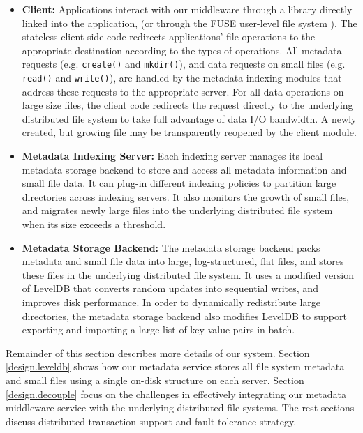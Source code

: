 \begin{itemize}
\item{\textbf{Client:}} Applications interact with our middleware
through a library directly linked into the application,
(or through the FUSE user-level file system \cite{fuse}).
The stateless client-side code redirects applications' file operations
to the appropriate destination according to the types of operations.
All metadata requests (e.g. \texttt{create()} and \texttt{mkdir()}),
and data requests on small files (e.g. \texttt{read()} and \texttt{write()}),
are handled by the metadata indexing modules that address
these requests to the appropriate server.
For all data operations on large size files, the client code redirects
the request directly to the underlying distributed file system to take full
advantage of data I/O bandwidth. A newly created, but growing file
may be transparently reopened by the client module.

\item{\textbf{Metadata Indexing Server:}}
Each indexing server manages its local metadata storage backend to store and
access all metadata information and small file data.
It can plug-in different indexing policies to
partition large directories across indexing servers.
It also monitors the growth of small files,
and migrates newly large files into the underlying distributed file system
when its size exceeds a threshold.

\item{\textbf{Metadata Storage Backend:}}
The metadata storage backend packs metadata and small file data into
large, log-structured, flat files, and stores these files
in the underlying distributed file system.
It uses a modified version of LevelDB \cite{leveldb} that
converts random updates into sequential writes, and improves disk performance.
In order to dynamically redistribute large directories,
the metadata storage backend also modifies LevelDB
to support exporting and importing a large list of key-value pairs in batch.

\end{itemize}

Remainder of this section describes more details of our system.
Section \ref{design.leveldb} shows how our metadata service
stores all file system metadata and small files
using a single on-disk structure on each server.
Section \ref{design.decouple} focus on the challenges in effectively
integrating our metadata middleware service with the underlying
distributed file systems. The rest sections discuss
distributed transaction support and fault tolerance strategy.

